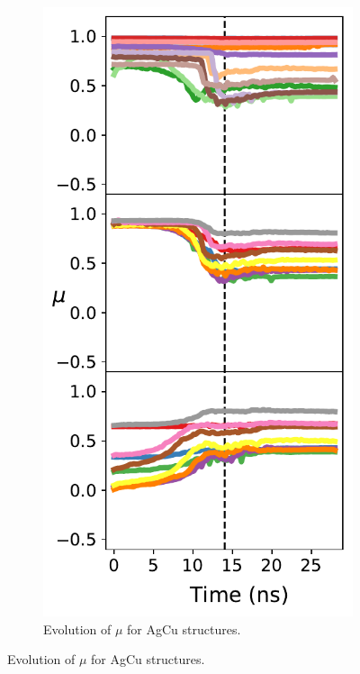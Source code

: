 \begin{figure}
\centering
\begin{subfigure}{0.39\textwidth}
    \centering
    \includegraphics[width=\linewidth]{figures/MD/Alloys/Mix_Ag-Cu.pdf}
    \caption{Evolution of $\mu$ for AgCu structures.}
    \label{fig:AgCuMix}

\end{subfigure}
\end{figure}

